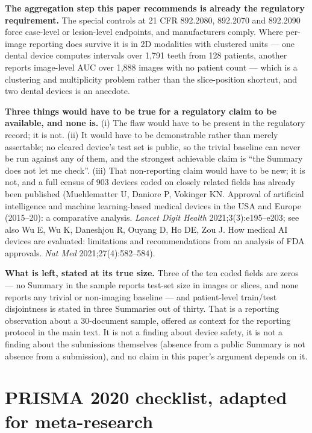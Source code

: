 \documentclass[11pt,a4paper]{article}
\begin{document}
\textbf{The aggregation step this paper recommends is already the regulatory
requirement.} The special controls at 21 CFR 892.2080, 892.2070 and 892.2090 force
case-level or lesion-level endpoints, and manufacturers comply. Where per-image
reporting does survive it is in 2D modalities with clustered units --- one dental
device computes intervals over 1{,}791 teeth from 128 patients, another reports
image-level AUC over 1{,}888 images with no patient count --- which is a clustering
and multiplicity problem rather than the slice-position shortcut, and two dental
devices is an anecdote.

\textbf{Three things would have to be true for a regulatory claim to be available, and
none is.} (i) The flaw would have to be present in the regulatory record; it is not.
(ii) It would have to be demonstrable rather than merely assertable; no cleared
device's test set is public, so the trivial baseline can never be run against any of
them, and the strongest achievable claim is ``the Summary does not let me check''.
(iii) That non-reporting claim would have to be new; it is not, and a full census of
903 devices coded on closely related fields has already been published (Muehlematter
U, Daniore P, Vokinger KN. Approval of artificial intelligence and machine
learning-based medical devices in the USA and Europe (2015--20): a comparative
analysis. \textit{Lancet Digit Health} 2021;3(3):e195--e203; see also Wu E, Wu K,
Daneshjou R, Ouyang D, Ho DE, Zou J. How medical AI devices are evaluated:
limitations and recommendations from an analysis of FDA approvals. \textit{Nat Med}
2021;27(4):582--584).

\textbf{What is left, stated at its true size.} Three of the ten coded fields are
zeros --- no Summary in the sample reports test-set size in images or slices, and none
reports any trivial or non-imaging baseline --- and patient-level train/test
disjointness is stated in three Summaries out of thirty. That is a reporting observation
about a 30-document sample, offered as context for the reporting protocol in the main
text. It is not a finding about device safety, it is not a finding about the
submissions themselves (absence from a public Summary is not absence from a
submission), and no claim in this paper's argument depends on it.

\clearpage
\section{PRISMA 2020 checklist, adapted for meta-research}
\end{document}
